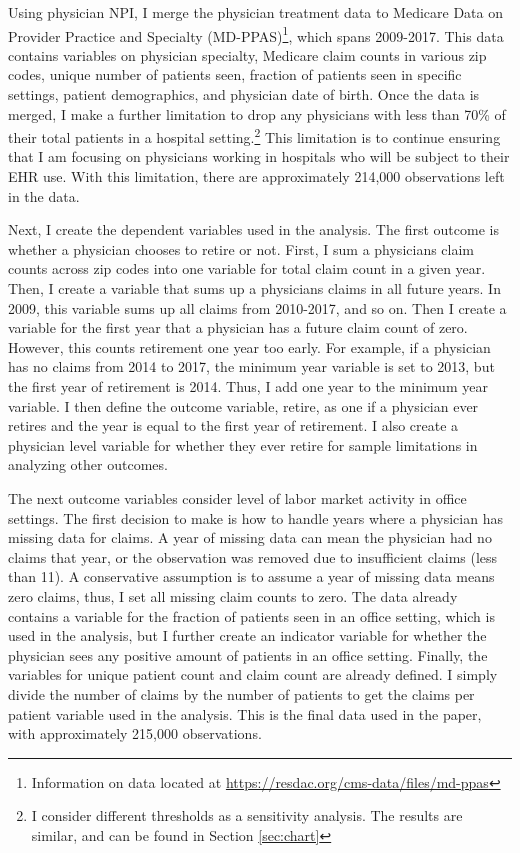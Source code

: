 \documentclass[12pt]{article}
\begin{document}
Using physician NPI, I merge the physician treatment data to Medicare Data on Provider Practice and Specialty (MD-PPAS)\footnote{Information on data located at \hyperlink{https://resdac.org/cms-data/files/md-ppas}{https://resdac.org/cms-data/files/md-ppas}}, which spans 2009-2017. This data contains variables on physician specialty, Medicare claim counts in various zip codes, unique number of patients seen, fraction of patients seen in specific settings, patient demographics, and physician date of birth. Once the data is merged, I make a further limitation to drop any physicians with less than 70\% of their total patients in a hospital setting.\footnote{I consider different thresholds as a sensitivity analysis. The results are similar, and can be found in Section \ref{sec:chart}} This limitation is to continue ensuring that I am focusing on physicians working in hospitals who will be subject to their EHR use. With this limitation, there are approximately 214,000 observations left in the data. 

Next, I create the dependent variables used in the analysis. The first outcome is whether a physician chooses to retire or not. First, I sum a physicians claim counts across zip codes into one variable for total claim count in a given year. Then, I create a variable that sums up a physicians claims in all future years. In 2009, this variable sums up all claims from 2010-2017, and so on. Then I create a variable for the first year that a physician has a future claim count of zero. However, this counts retirement one year too early. For example, if a physician has no claims from 2014 to 2017, the minimum year variable is set to 2013, but the first year of retirement is 2014. Thus, I add one year to the minimum year variable. I then define the outcome variable, retire, as one if a physician ever retires and the year is equal to the first year of retirement. I also create a physician level variable for whether they ever retire for sample limitations in analyzing other outcomes. 

The next outcome variables consider level of labor market activity in office settings. The first decision to make is how to handle years where a physician has missing data for claims. A year of missing data can mean the physician had no claims that year, or the observation was removed due to insufficient claims (less than 11). A conservative assumption is to assume a year of missing data means zero claims, thus, I set all missing claim counts to zero. The data already contains a variable for the fraction of patients seen in an office setting, which is used in the analysis, but I further create an indicator variable for whether the physician sees any positive amount of patients in an office setting. Finally, the variables for unique patient count and claim count are already defined. I simply divide the number of claims by the number of patients to get the claims per patient variable used in the analysis. This is the final data used in the paper, with approximately 215,000 observations. 
\end{document}
